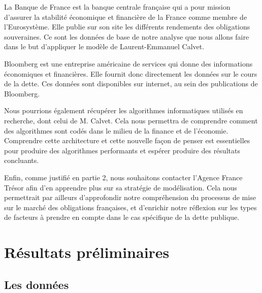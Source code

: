 \documentclass[a4paper]{article}
\begin{document}
La Banque de France est la banque centrale française qui a pour mission d’assurer la stabilité économique et financière de la France comme membre de l’Eurosystème. Elle publie sur son site les différents rendements des obligations souveraines. Ce sont les données de base de notre analyse que nous allons faire dans le but d’appliquer le modèle de Laurent-Emmanuel Calvet.

Bloomberg est une entreprise américaine de services qui donne des informations économiques et financières. Elle fournit donc directement les données sur le cours de la dette. Ces données sont disponibles sur internet, au sein des publications de Bloomberg.   

Nous pourrions également récupérer les algorithmes informatiques utilisés en recherche, dont celui de M. Calvet. Cela nous permettra de comprendre comment des algorithmes sont codés dans le milieu de la finance et de l’économie. Comprendre cette architecture et cette nouvelle façon de penser est essentielles pour produire des algorithmes performants et espérer produire des résultats concluants.

Enfin, comme justifié en partie 2, nous souhaitons contacter l’Agence France Trésor afin d’en apprendre plus sur sa stratégie de modélisation. Cela nous permettrait par ailleurs d’approfondir notre compréhension du processus de mise sur le marché des obligations françaises, et d’enrichir notre réflexion sur les types de facteurs à prendre en compte dans le cas spécifique de la dette publique.




\section{Résultats préliminaires}
\subsection{Les données}
\end{document}
